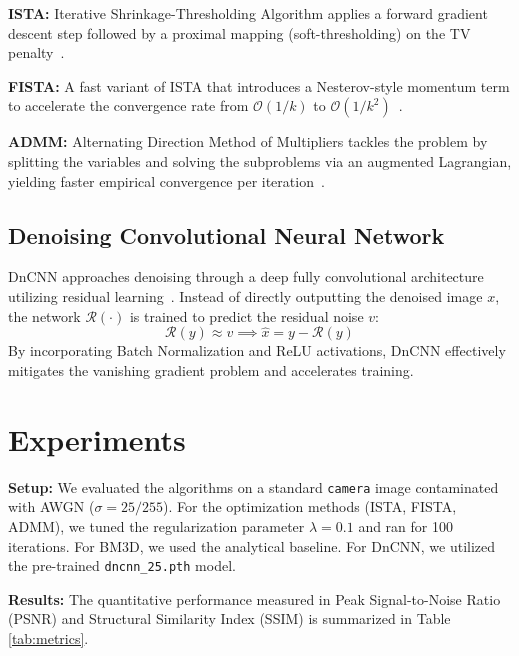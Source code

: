 \noindent \textbf{ISTA:} Iterative Shrinkage-Thresholding Algorithm applies a forward gradient descent step followed by a proximal mapping (soft-thresholding) on the TV penalty~\cite{daubechies2004iterative}.

\noindent \textbf{FISTA:} A fast variant of ISTA that introduces a Nesterov-style momentum term to accelerate the convergence rate from $\mathcal{O}(1/k)$ to $\mathcal{O}(1/k^2)$~\cite{beck2009fast}.

\noindent \textbf{ADMM:} Alternating Direction Method of Multipliers tackles the problem by splitting the variables and solving the subproblems via an augmented Lagrangian, yielding faster empirical convergence per iteration~\cite{boyd2011distributed}.

\subsection{Denoising Convolutional Neural Network}
DnCNN approaches denoising through a deep fully convolutional architecture utilizing residual learning~\cite{zhang2017beyond}. Instead of directly outputting the denoised image $x$, the network $\mathcal{R}(\cdot)$ is trained to predict the residual noise $v$:
\begin{equation}
\mathcal{R}(y) \approx v \implies \hat{x} = y - \mathcal{R}(y)
\end{equation}
By incorporating Batch Normalization and ReLU activations, DnCNN effectively mitigates the vanishing gradient problem and accelerates training.

\section{Experiments}
\textbf{Setup:} We evaluated the algorithms on a standard \texttt{camera} image contaminated with AWGN ($\sigma = 25/255$). For the optimization methods (ISTA, FISTA, ADMM), we tuned the regularization parameter $\lambda=0.1$ and ran for 100 iterations. For BM3D, we used the analytical baseline. For DnCNN, we utilized the pre-trained \texttt{dncnn\_25.pth} model. 

\textbf{Results:}
The quantitative performance measured in Peak Signal-to-Noise Ratio (PSNR) and Structural Similarity Index (SSIM) is summarized in Table \ref{tab:metrics}. 

